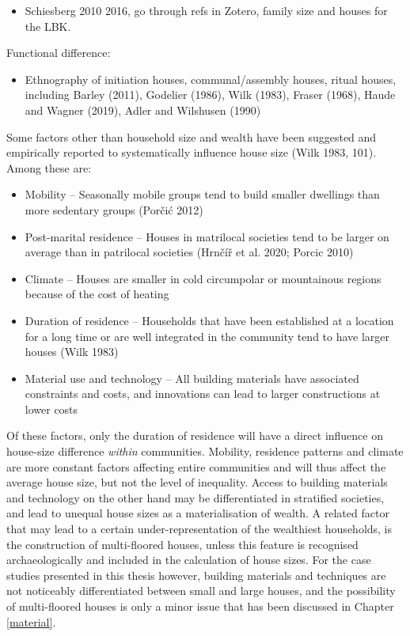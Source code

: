 \documentclass[
  12pt,
  a4paper, twoside]{book}
\providecommand{\tightlist}{%
  \setlength{\itemsep}{0pt}\setlength{\parskip}{0pt}}
\begin{document}
\begin{itemize}
\tightlist
\item
  Schiesberg 2010 2016, go through refs in Zotero, family size and houses for the LBK.
\end{itemize}

Functional difference:

\begin{itemize}
\tightlist
\item
  Ethnography of initiation houses, communal/assembly houses, ritual houses, including Barley (2011), Godelier (1986), Wilk (1983), Fraser (1968), Haude and Wagner (2019), Adler and Wilshusen (1990)
\end{itemize}

Some factors other than household size and wealth have been suggested and empirically reported to systematically influence house size (Wilk 1983, 101). Among these are:

\begin{itemize}
\item
  Mobility -- Seasonally mobile groups tend to build smaller dwellings than more sedentary groups (Porčić 2012)
\item
  Post-marital residence -- Houses in matrilocal societies tend to be larger on average than in patrilocal societies (Hrnčíř et al. 2020; Porcic 2010)
\item
  Climate -- Houses are smaller in cold circumpolar or mountainous regions because of the cost of heating
\item
  Duration of residence -- Households that have been established at a location for a long time or are well integrated in the community tend to have larger houses (Wilk 1983)
\item
  Material use and technology -- All building materials have associated constraints and costs, and innovations can lead to larger constructions at lower costs
\end{itemize}

Of these factors, only the duration of residence will have a direct influence on house-size difference \emph{within} communities. Mobility, residence patterns and climate are more constant factors affecting entire communities and will thus affect the average house size, but not the level of inequality. Access to building materials and technology on the other hand may be differentiated in stratified societies, and lead to unequal house sizes as a materialisation of wealth. A related factor that may lead to a certain under-representation of the wealthiest households, is the construction of multi-floored houses, unless this feature is recognised archaeologically and included in the calculation of house sizes. For the case studies presented in this thesis however, building materials and techniques are not noticeably differentiated between small and large houses, and the possibility of multi-floored houses is only a minor issue that has been discussed in Chapter \ref{material}.
\end{document}
